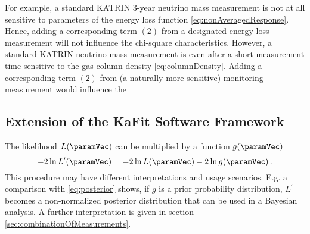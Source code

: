For example, a standard KATRIN 3-year neutrino mass measurement is not at all sensitive to parameters of the energy loss function \eqref{eq:nonAveragedResponse}. Hence, adding a corresponding term $(2)$ from a designated energy loss measurement will not influence the chi-square characteristics. However, a standard KATRIN neutrino mass measurement is even after a short measurement time sensitive to the gas column density \eqref{eq:columnDensity}. Adding a corresponding term $(2)$ from (a naturally more sensitive) monitoring measurement would influence the   



\subsection{Extension of the KaFit Software Framework}
\label{sec:statLikelihoodExtImpl}
The likelihood $L(\paramVec)$ can be multiplied by a function $g(\paramVec)$
\begin{equation}
\label{eq:likelihoodExtension}
-2\ln L^\prime(\paramVec) = -2\ln L(\paramVec) -2\ln g(\paramVec)
\fullstop
\end{equation}
This procedure may have different interpretations and usage scenarios. E.g. a comparison with \eqref{eq:posterior} shows, if $g$ is a prior probability distribution, $L^\prime$ becomes a non-normalized posterior distribution that can be used in a Bayesian analysis. A further interpretation is given in section \ref{sec:combinationOfMeasurements}.
\label{sec:combinationOfMeasurements}

